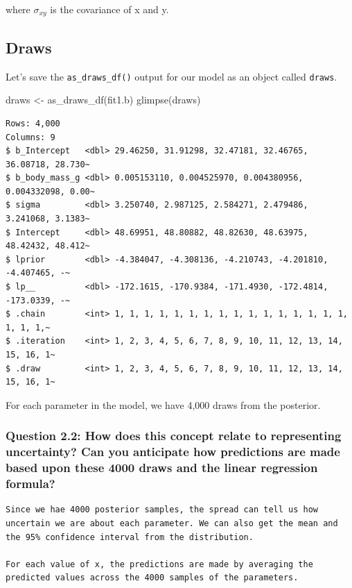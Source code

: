 \documentclass[
  letterpaper,
  DIV=11,
  numbers=noendperiod]{scrartcl}
\newenvironment{Shaded}{\begin{snugshade}}{\end{snugshade}}
\newcommand{\FunctionTok}[1]{\textcolor[rgb]{0.28,0.35,0.67}{#1}}
\newcommand{\NormalTok}[1]{\textcolor[rgb]{0.00,0.23,0.31}{#1}}
\newcommand{\OtherTok}[1]{\textcolor[rgb]{0.00,0.23,0.31}{#1}}
\begin{document}
where \(\sigma_{xy}\) is the covariance of x and y.

\subsection{Draws}\label{draws}

Let's save the \texttt{as\_draws\_df()} output for our model as an
object called \texttt{draws}.

\begin{Shaded}
\begin{Highlighting}[]
\NormalTok{draws }\OtherTok{\textless{}{-}} \FunctionTok{as\_draws\_df}\NormalTok{(fit1.b)}
\FunctionTok{glimpse}\NormalTok{(draws)}
\end{Highlighting}
\end{Shaded}

\begin{verbatim}
Rows: 4,000
Columns: 9
$ b_Intercept   <dbl> 29.46250, 31.91298, 32.47181, 32.46765, 36.08718, 28.730~
$ b_body_mass_g <dbl> 0.005153110, 0.004525970, 0.004380956, 0.004332098, 0.00~
$ sigma         <dbl> 3.250740, 2.987125, 2.584271, 2.479486, 3.241068, 3.1383~
$ Intercept     <dbl> 48.69951, 48.80882, 48.82630, 48.63975, 48.42432, 48.412~
$ lprior        <dbl> -4.384047, -4.308136, -4.210743, -4.201810, -4.407465, -~
$ lp__          <dbl> -172.1615, -170.9384, -171.4930, -172.4814, -173.0339, -~
$ .chain        <int> 1, 1, 1, 1, 1, 1, 1, 1, 1, 1, 1, 1, 1, 1, 1, 1, 1, 1, 1,~
$ .iteration    <int> 1, 2, 3, 4, 5, 6, 7, 8, 9, 10, 11, 12, 13, 14, 15, 16, 1~
$ .draw         <int> 1, 2, 3, 4, 5, 6, 7, 8, 9, 10, 11, 12, 13, 14, 15, 16, 1~
\end{verbatim}

For each parameter in the model, we have 4,000 draws from the posterior.

\subsubsection{Question 2.2: How does this concept relate to
representing uncertainty? Can you anticipate how predictions are made
based upon these 4000 draws and the linear regression
formula?}\label{question-2.2-how-does-this-concept-relate-to-representing-uncertainty-can-you-anticipate-how-predictions-are-made-based-upon-these-4000-draws-and-the-linear-regression-formula}

\begin{verbatim}
Since we hae 4000 posterior samples, the spread can tell us how uncertain we are about each parameter. We can also get the mean and the 95% confidence interval from the distribution.

For each value of x, the predictions are made by averaging the predicted values across the 4000 samples of the parameters.
\end{verbatim}
\end{document}
